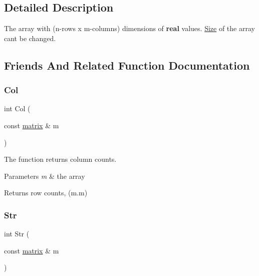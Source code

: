 \subsection{Detailed Description}
The array with (n-\/rows x m-\/columns) dimensions of {\bfseries real} values. \mbox{\hyperlink{struct_size}{Size}} of the array can\textquotesingle{}t be changed. 

\subsection{Friends And Related Function Documentation}
\mbox{\label{classmatrix_a54850708093c314282f7f9c8162a493b}} 
\subsubsection{\texorpdfstring{Col}{Col}}
{\footnotesize\ttfamily int Col (\begin{DoxyParamCaption}\item[{const \mbox{\hyperlink{classmatrix}{matrix}} \&}]{m }\end{DoxyParamCaption})\hspace{0.3cm}{\ttfamily [friend]}}



The function returns column counts. 


\begin{DoxyParams}{Parameters}
{\em m} & the array \\
\hline
\end{DoxyParams}
\begin{DoxyReturn}{Returns}
row counts, (m.\+m) 
\end{DoxyReturn}
\mbox{\label{classmatrix_a55ecd7691eca1e7dac81020e9bd69038}} 
\subsubsection{\texorpdfstring{Str}{Str}}
{\footnotesize\ttfamily int Str (\begin{DoxyParamCaption}\item[{const \mbox{\hyperlink{classmatrix}{matrix}} \&}]{m }\end{DoxyParamCaption})\hspace{0.3cm}{\ttfamily [friend]}}



